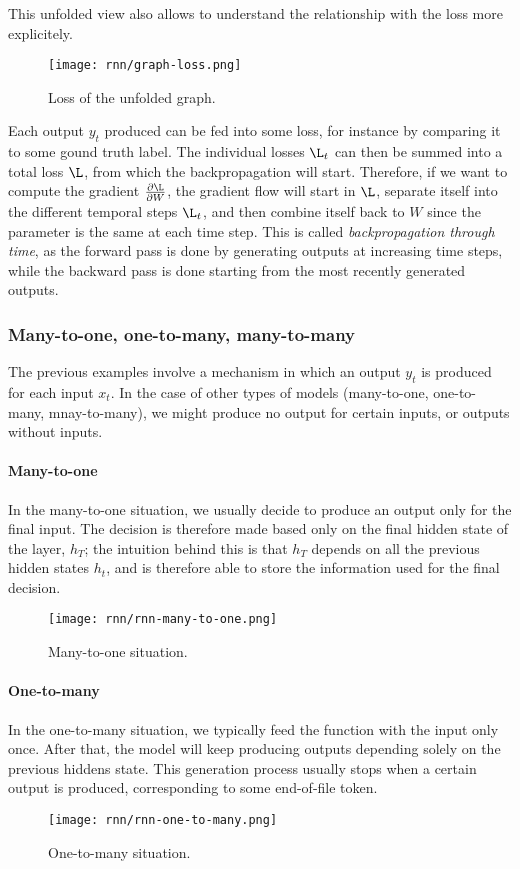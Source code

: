 This unfolded view also allows to understand the relationship with the loss more explicitely.
\begin{figure}[H]
    \centering
    \texttt{[image: rnn/graph-loss.png]}
    \caption{Loss of the unfolded graph.}
\end{figure}
Each output $y_t$ produced can be fed into some loss, for instance by comparing it to some gound truth label. The individual losses $\L_t$ can then be summed into a total loss $\L$, from which the backpropagation will start. Therefore, if we want to compute the gradient $\frac{\partial\L}{\partial W}$, the gradient flow will start in $\L$, separate itself into the different temporal steps $\L_t$, and then combine itself back to $W$ since the parameter is the same at each time step. This is called \emph{backpropagation through time}, as the forward pass is done by generating outputs at increasing time steps, while the backward pass is done starting from the most recently generated outputs.

\subsubsection{Many-to-one, one-to-many, many-to-many}
The previous examples involve a mechanism in which an output $y_t$ is produced for each input $x_t$. In the case of other types of models (many-to-one, one-to-many, mnay-to-many), we might produce no output for certain inputs, or outputs without inputs.

\paragraph*{Many-to-one}
In the many-to-one situation, we usually decide to produce an output only for the final input. The decision is therefore made based only on the final hidden state of the layer, $h_T$; the intuition behind this is that $h_T$ depends on all the previous hidden states $h_t$, and is therefore able to store the information used for the final decision. 
\begin{figure}[H]
    \centering
    \texttt{[image: rnn/rnn-many-to-one.png]}
    \caption{Many-to-one situation.}
\end{figure}

\paragraph*{One-to-many}
In the one-to-many situation, we typically feed the function with the input only once. After that, the model will keep producing outputs depending solely on the previous hiddens state. This generation process usually stops when a certain output is produced, corresponding to some end-of-file token. 
\begin{figure}[H]
    \centering
    \texttt{[image: rnn/rnn-one-to-many.png]}
    \caption{One-to-many situation.}
\end{figure}


